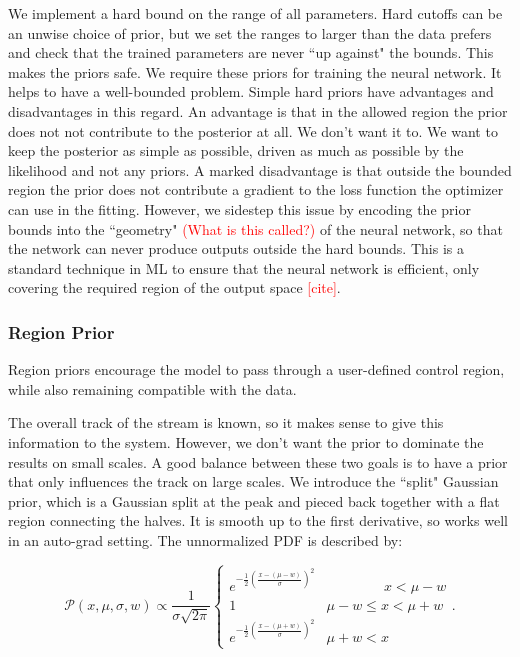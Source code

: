 \documentclass[twocolumn]{aastex631}
\newcommand{\mcal}[1]{\mathcal{#1}}
\newcommand{\Exp}[1]{e^{#1}}
\newcommand{\pdf}{\mcal{P}}
\newcommand{\TODO}[1]{{\textcolor{red}{#1}}}
\begin{document}
            We implement a hard bound on the range of all parameters.
            Hard cutoffs can be an unwise choice of prior, but we set the ranges to larger than the data prefers and check that the trained parameters are never ``up against" the bounds.
            This makes the priors safe.
            We require these priors for training the neural network. It helps to have a well-bounded problem. Simple hard priors have advantages and disadvantages in this regard.
            An advantage is that in the allowed region the prior does not not contribute to the posterior at all. We don't want it to. We want to keep the posterior as simple as possible, driven as much as possible by the likelihood and not any priors.
            A marked disadvantage is that outside the bounded region the prior does not contribute a gradient to the loss function the optimizer can use in the fitting.
            However, we sidestep this issue by encoding the prior bounds into the ``geometry" \TODO{(What is this called?)} of the neural network, so that the network can never
            produce outputs outside the hard bounds. This is a standard technique in ML to ensure that the neural network is efficient, only covering the required region of the output space \TODO{[cite]}. 


        \subsubsection{Region Prior} \label{sub:track_region_prior}


            Region priors encourage the model to pass through a user-defined control region, while also remaining compatible with the data.

            The overall track of the stream is known, so it makes sense to give this information to the system. However, we don't want the prior to dominate the results on small scales. A good balance between these two goals is to have a prior that only influences the track on large scales.
            We introduce the ``split" Gaussian prior, which is a Gaussian split at the peak and pieced back together with a flat region connecting the halves. 
            It is smooth up to the first derivative, so works well in an auto-grad setting.
            The unnormalized PDF is described by:
            \begin{small}
            \begin{equation}
                \pdf(x,\mu,\sigma,w) \propto  \frac{1}{\sigma \sqrt{2 \pi}} \begin{cases} 
                   \Exp{-\frac{1}{2}\left(\frac{x-(\mu-w)}{\sigma}\right)^2} & \phantom{\mu - w <}\ x < \mu - w \\
                    1 & \mu - w \leq x < \mu + w \\
                    \Exp{-\frac{1}{2}\left(\frac{x-(\mu+w)}{\sigma}\right)^2} & \mu + w < x
                \end{cases}.
            \end{equation}\end{small}
    
\end{document}

